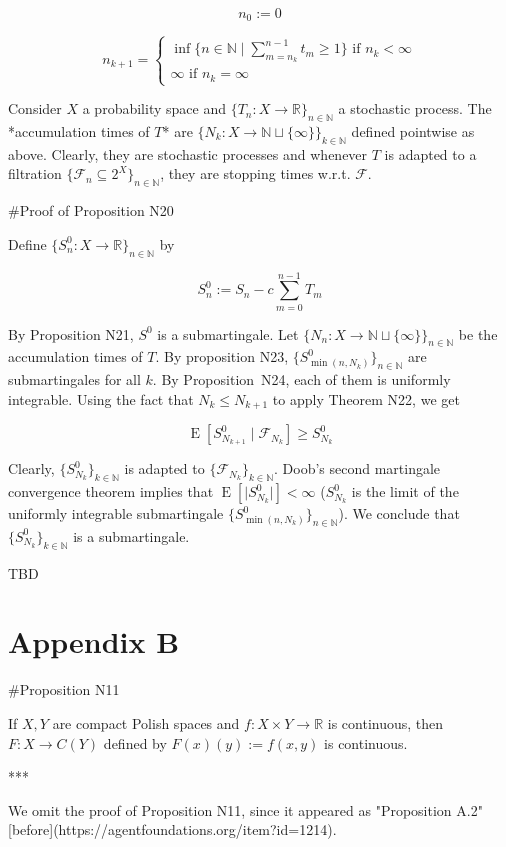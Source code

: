 \documentclass[a4paper]{article}
\DeclareMathOperator{\E}{E}
\newcommand{\Nats}{\mathbb{N}}
\newcommand{\Reals}{\mathbb{R}}
\newcommand{\Sq}[2]{\{#1\}_{#2 \in \Nats}}
\newcommand{\Sqn}[1]{\Sq{#1}{n}}
\newcommand{\Abs}[1]{\lvert #1 \rvert}
\newcommand{\F}{\mathcal{F}}
\begin{document}
$$n_0 := 0$$

$$n_{k+1} = \begin{cases}\inf \{n \in \Nats \mid \sum_{m=n_k}^{n-1} t_m \geq 1\} \text{ if } n_k < \infty\\\infty \text{ if } n_k = \infty\end{cases}$$

Consider ${X}$ a probability space and ${\{T_n:X \rightarrow \Reals\}_{n \in \Nats}}$ a stochastic process. The *accumulation times of ${T}$* are ${\{N_k: X \rightarrow \Nats \sqcup \{\infty\}\}_{k \in \Nats}}$ defined pointwise as above. Clearly, they are stochastic processes and whenever ${T}$ is adapted to a filtration ${\Sqn{\F_n \subseteq 2^X}}$, they are stopping times w.r.t. ${\F}$.

\#Proof of Proposition N20

Define ${\Sqn{S^0_n: X \rightarrow \Reals}}$ by

$$S^0_n := S_n - c \sum_{m=0}^{n-1} T_m$$

By Proposition N21, ${S^0}$ is a submartingale. Let ${\Sqn{N_n:X \rightarrow \Nats \sqcup \{\infty\}}}$ be the accumulation times of ${T}$. By proposition N23, ${\Sqn{S^0_{\min(n,N_k)}}}$ are submartingales for all ${k}$. By Proposition\ N24, each of them is uniformly integrable. Using the fact that ${N_{k} \leq N_{k+1}}$ to apply Theorem N22, we get

$$\E[S^0_{N_{k+1}} \mid \F_{N_k}] \geq S^0_{N_{k}}$$

Clearly, ${\Sq{S^0_{N_k}}{k}}$ is adapted to ${\Sq{\F_{N_k}}{k}}$. Doob's second martingale convergence theorem implies that ${\E[\Abs{S^0_{N_k}}] < \infty}$ (${S^0_{N_k}}$ is the limit of the uniformly integrable submartingale ${\Sqn{S^0_{\min(n,N_k)}}}$). We conclude that ${\Sq{S^0_{N_k}}{k}}$ is a submartingale.

TBD

\section{Appendix B}

\#Proposition N11

If ${X,Y}$ are compact Polish spaces and ${f: X \times Y \rightarrow \Reals}$ is continuous, then ${F: X \rightarrow C(Y)}$ defined by ${F(x)(y):=f(x,y)}$ is continuous.

***

We omit the proof of Proposition N11, since it appeared as "Proposition A.2" [before](https://agentfoundations.org/item?id=1214).
\end{document}
